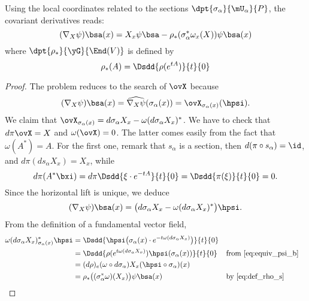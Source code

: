 \begin{theorem}
Using the local coordinates related to the sections $\dpt{\sigma_{\alpha}}{\mU_{\alpha}}{P}$, the covariant derivatives reads:
\begin{equation}\label{eq:nabla_coord}
(\nabla_X\psi)\bsa(x)=X_x\psi\bsa-\rho_*(\sigma_{\alpha}^*\omega_x(X))\psi\bsa(x)
\end{equation}
where $\dpt{\rho_*}{\yG}{\End(V)}$ is defined by
\begin{equation}  \label{eq:def_rho_s}
  \rho_*(A)=\Dsdd{\rho(e^{tA})}{t}{0}
\end{equation}

\end{theorem}

\begin{proof}
The problem reduces to the search of $\ovX$ because
\[
   (\nabla_X\psi)\bsa(x)=\widehat{\nabla_X\psi}(\sigma_{\alpha}(x))=\ovX_{\sigma_{\alpha}(x)}(\hpsi).
\]
We claim that $\ovX_{\sigma_{\alpha}(x)}=d\sigma_{\alpha} X_x-\omega(d\sigma_{\alpha} X_x)^*$. We have to check that $d\pi\ovX=X$ and $\omega(\ovX)=0$. The latter comes easily from the fact that $\omega(A^*)=A$. For the first one, remark that $s_{\alpha}$ is a section, then $d(\pi\circ s_{\alpha})=\id$, and $d\pi(ds_{\alpha} X_x)=X_x$, while
\begin{equation}
  d\pi(A^*\bxi)=d\pi\Dsdd{\xi\cdot e^{-tA}}{t}{0}
               =\Dsdd{\pi(\xi)}{t}{0}
               =0.
\end{equation}
Since the horizontal lift is unique, we deduce
\begin{equation}
  (\nabla_X\psi)\bsa(x)=\big(  d\sigma_{\alpha} X_x-\omega(d\sigma_{\alpha} X_x)^*  \big)\hpsi.
\end{equation}
From the definition of a fundamental vector field,
\begin{equation}
\begin{aligned}
    \omega(d\sigma_{\alpha} X_x)^*_{\sigma_{\alpha}(x)}\hpsi
           &=\Dsdd{\hpsi\big(\sigma_{\alpha}(x)\cdot e^{-t\omega(d\sigma_{\alpha} X_x)}  \big) }{t}{0}\\
           &=\Dsdd{\rho(e^{t\omega(d\sigma_{\alpha} X_x)})\hpsi(\sigma_{\alpha}(x))}{t}{0}&&\text{from \eqref{eq:equiv_psi_b}}\\
           &=(d\rho)_e(\omega\circ d\sigma_{\alpha})X_x(\hpsi\circ\sigma_{\alpha})(x)\\
           &=\rho_*\big( (\sigma_{\alpha}^*\omega)(X_x) \big)\psi\bsa(x)    &&\text{by \eqref{eq:def_rho_s}}
\end{aligned}
\end{equation}

\end{proof}
 

